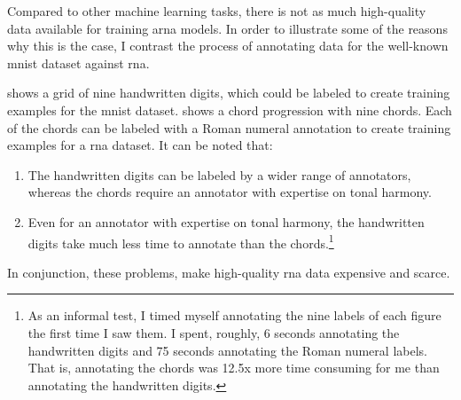 

Compared to other machine learning tasks, there is not as
much high-quality data available for training \gls{arna}
models. In order to illustrate some of the reasons why this
is the case, I contrast the process of annotating data for
the well-known \gls{mnist} dataset
\parencite{lecun1989handwritten} against \gls{rna}.


 shows a grid of nine handwritten digits,
which could be labeled to create training examples for the
\gls{mnist} dataset.  shows a chord
progression with nine chords. Each of the chords can be
labeled with a Roman numeral annotation to create training
examples for a \gls{rna} dataset. It can be noted that:

\begin{enumerate}
    \item The handwritten digits can be labeled by a wider
    range of annotators, whereas the chords require an
    annotator with expertise on tonal harmony.
    \item Even for an annotator with expertise on tonal
    harmony, the handwritten digits take much less time to
    annotate than the chords.\footnote{As an informal test,
    I timed myself annotating the nine labels of each figure
    the first time I saw them. I spent, roughly, 6 seconds
    annotating the handwritten digits and 75 seconds
    annotating the Roman numeral labels. That is, annotating
    the chords was 12.5x more time consuming for me than
    annotating the handwritten digits.}
\end{enumerate}

In conjunction, these problems, make high-quality \gls{rna}
data expensive and scarce.


